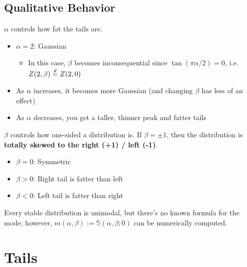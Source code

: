 \documentclass[twoside,10pt]{report}
\begin{document}

\subsection{Qualitative Behavior}

$\alpha$ controls how fat the tails are.
\begin{itemize}
	\item $\alpha = 2$: Gaussian
		\begin{itemize}
			\item In this case, $\beta$ becomes inconsequential since $\tan(\pi \alpha/2) = 0$, i.e. $Z(2,\beta) \stackrel{d}{=} Z(2,0)$
		\end{itemize}
	\item As $\alpha$ increases, it becomes more Gaussian (and changing $\beta$ has less of an effect)
	\item As $\alpha$ decreases, you get a taller, thinner peak and fatter tails
\end{itemize}
$\beta$ controls how one-sided a distribution is. If $\beta = \pm 1$, then the distribution is \textbf{totally skewed to the right (+1) / left (-1)}.
\begin{itemize}
	\item $\beta=0$: Symmetric
	\item $\beta > 0$: Right tail is fatter than left
	\item $\beta < 0$: Left tail is fatter than right
\end{itemize}


Every stable distribution is unimodal, but there's no known formula for the mode; however, $m(\alpha,\beta) := \mathbb{S}(\alpha,\beta;0)$ can be numerically computed.


\section{Tails}


\end{document}

